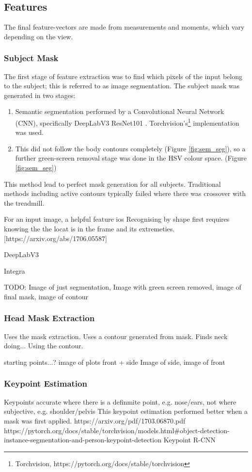 \documentclass[conference]{IEEEtran} %
\begin{document}
\subsection{Features}
\noindent The final feature-vectors are made from measurements and moments, which vary depending on the view.

\subsubsection{Subject Mask}
The first stage of feature extraction was to find which pixels of the input belong to the subject; this is referred to as image segmentation. The subject mask was generated in two stages: 
\begin{enumerate}
  \item Semantic segmentation performed by a Convolutional Neural Network (CNN), specifically DeepLabV3 ResNet101 \cite{DBLP:journals/corr/ChenPSA17}. Torchvision's\footnote{Torchvision, https://pytorch.org/docs/stable/torchvision} implementation was used.
  \item This did not follow the body contours completely (Figure \ref{fig:sem_seg}), so a further green-screen removal stage was done in the HSV colour space. (Figure \ref{fig:sem_seg})
\end{enumerate}
This method lead to perfect mask generation for all subjects. Traditional methods including active contours typically failed where there was crossover with the treadmill. 

For an input image, a helpful feature ios 
Recognising by shape first requires knowing the the locat is in the frame and its extremeties. 
[https://arxiv.org/abs/1706.05587]

DeepLabV3


Integra

TODO: Image of just segmentation, Image with green screen removed, image of final mask, image of contour




\subsubsection{Head Mask Extraction}
Uses the mask extraction.
Uses a contour generated from mask.
Finds neck doing...
Using the contour.

starting points...?
image of plots front + side
Image of side, image of front


\subsubsection{Keypoint Estimation}
Keypoints accurate where there is a definmite point, e.g. nose/ears, not where subjective, e.g. shoulder/pelvis
This keypoint estimation performed better when a mask was first applied.
https://arxiv.org/pdf/1703.06870.pdf
https://pytorch.org/docs/stable/torchvision/models.html#object-detection-instance-segmentation-and-person-keypoint-detection
Keypoint R-CNN
\end{document}
